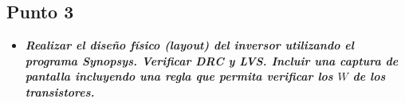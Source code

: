 
\subsection{Punto \textbf{3}}

\begin{itemize}
\item \emph{\textbf{Realizar el diseño físico (layout) del inversor utilizando el programa Synopsys. Verificar DRC y LVS. Incluir una captura de pantalla incluyendo una regla que permita verificar los $W$ de los transistores.}}
\end{itemize}





